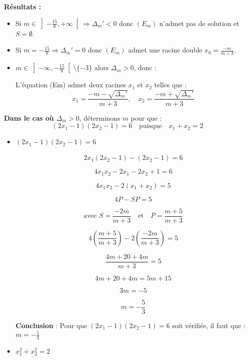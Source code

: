 \documentclass[12pt,a4paper]{article}
\begin{document}
\begin{enumerate}
\noindent \textbf{Résultats :}

\begin{itemize}
    \item Si $m \in \left]-\frac{15}{8}, +\infty\right[ \Rightarrow \Delta_m' < 0$ donc $(E_m)$ n'admet pas de solution et $S = \emptyset$.
    \item Si $m = -\frac{15}{8} \Rightarrow \Delta_m' = 0$ donc $(E_m)$ admet une racine double $x_{0}=\frac{-m}{m+3}$.

		\item \( m \in \left]-\infty, -\frac{15}{8} \right[ \setminus \{-3\} \) alors \( \Delta_m > 0 \), donc :

L'équation (Em) admet deux racines \(x_1\) et \(x_2\) telles que :
\[
x_1 = \frac{-m - \sqrt{\Delta_m'}}{m+3}, \quad x_2 = \frac{-m + \sqrt{\Delta_m'}}{m+3}
\]
\end{itemize}

\textbf{Dans le cas où \( \Delta_m > 0 \)}, déterminons \( m \) pour que :
\[
(2x_1 - 1)(2x_2 - 1) = 6 \quad \text{puisque} \quad x_1 + x_2 = 2
\]
\begin{itemize}

\item $ \underline{(2x_1 - 1)(2x_2 - 1) = 6} $

\[
2x_1 (2x_2 - 1) - (2x_2 - 1) = 6
\]

\[
4x_1 x_2 - 2x_1 - 2x_2 + 1 = 6
\]

\[
4x_1 x_2 - 2(x_1 + x_2) = 5
\]

\[
4P - SP = 5
\]

\[ \text{avec }
S = \frac{-2m}{m+3} \quad \text{et} \quad P = \frac{m+5}{m+3}
\]

\[
4 \left( \frac{m+5}{m+3} \right) - 2 \left( \frac{-2m}{m+3} \right) = 5
\]

\[
\frac{4m + 20 + 4m}{m+3} = 5
\]

\[
4m + 20 + 4m = 5m + 15
\]

\[
3m = -5
\]

\[
m = -\frac{5}{3}
\]

\textbf{Conclusion} :  
Pour que \( (2x_1 - 1)(2x_2 - 1) = 6 \) soit vérifiée, il faut que :
\(
m = -\frac{5}{3}
\)
\newpage
\item $ \underline{x_1^{2} + x_2^{2} = 2} $


\end{itemize}
\end{enumerate}
\end{document}
